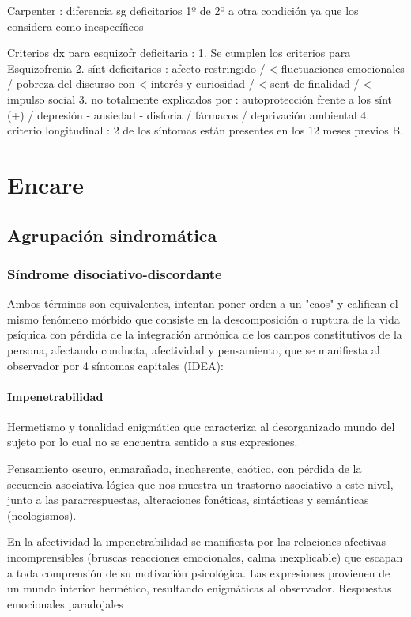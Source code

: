 Carpenter : diferencia sg deficitarios 1º de 2º a otra condición ya que los considera como inespecíficos

Criterios dx para esquizofr deficitaria :
1. Se cumplen los criterios para Esquizofrenia
2. sínt deficitarios : afecto restringido / < fluctuaciones emocionales / pobreza del discurso con < interés y curiosidad / < sent de finalidad / < impulso social
3. no totalmente explicados por : autoprotección frente a los sínt (+) / depresión - ansiedad - disforia / fármacos / deprivación ambiental
4. criterio longitudinal : 2 de los síntomas están presentes en los 12 meses previos B.
\section*{Encare}
\subsection*{Agrupación sindromática}
\subsubsection*{Síndrome disociativo-discordante}
Ambos términos son equivalentes, intentan poner orden a un "caos" y califican el mismo fenómeno mórbido que consiste en la descomposición o ruptura de la vida psíquica con pérdida de la integración armónica de los campos constitutivos de la persona, afectando conducta, afectividad y pensamiento, que se manifiesta al observador por 4 síntomas capitales (IDEA):

\paragraph*{Impenetrabilidad}
Hermetismo y tonalidad enigmática que caracteriza al desorganizado mundo del sujeto por lo cual no se encuentra sentido a sus expresiones.

Pensamiento oscuro, enmarañado, incoherente, caótico, con pérdida de la secuencia asociativa lógica que nos muestra un trastorno asociativo a este nivel, junto a las pararrespuestas, alteraciones fonéticas, sintácticas y semánticas (neologismos).

En la afectividad la impenetrabilidad se manifiesta por las relaciones afectivas incomprensibles (bruscas reacciones emocionales, calma inexplicable) que escapan a toda comprensión de su motivación psicológica. Las expresiones provienen de un mundo interior hermético, resultando enigmáticas al observador. Respuestas emocionales paradojales

